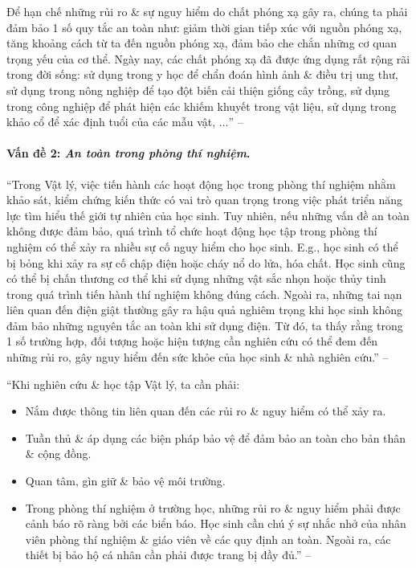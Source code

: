 \documentclass[oneside]{book}
\numberwithin{equation}{section}
\begin{document}
Để hạn chế những rủi ro \& sự nguy hiểm do chất phóng xạ gây ra, chúng ta phải đảm bảo 1 số quy tắc an toàn như: giảm thời gian tiếp xúc với nguồn phóng xạ, tăng khoảng cách từ ta đến nguồn phóng xạ, đảm bảo che chắn những cơ quan trọng yếu của cơ thể. Ngày nay, các chất phóng xạ đã được ứng dụng rất rộng rãi trong đời sống: sử dụng trong y học để chẩn đoán hình ảnh \& điều trị ung thư, sử dụng trong nông nghiệp để tạo đột biến cải thiện giống cây trồng, sử dụng trong công nghiệp để phát hiện các khiếm khuyết trong vật liệu, sử dụng trong khảo cổ để xác định tuổi của các mẫu vật, $\ldots$'' -- \cite[pp. 12--13]{SGK_Vat_Ly_10_Chan_Troi_Sang_Tao}

\paragraph{Vấn đề 2: \textit{An toàn trong phòng thí nghiệm}.} ``Trong Vật lý, việc tiến hành các hoạt động học trong phòng thí nghiệm nhằm khảo sát, kiểm chứng kiến thức có vai trò quan trọng trong việc phát triển năng lực tìm hiểu thế giới tự nhiên của học sinh. Tuy nhiên, nếu những vấn đề an toàn không được đảm bảo, quá trình tổ chức hoạt động học tập trong phòng thí nghiệm có thể xảy ra nhiều sự cố nguy hiểm cho học sinh. E.g., học sinh có thể bị bỏng khi xảy ra sự cố chập điện hoặc cháy nổ do lửa, hóa chất. Học sinh cũng có thể bị chấn thương cơ thể khi sử dụng những vật sắc nhọn hoặc thủy tinh trong quá trình tiến hành thí nghiệm không đúng cách. Ngoài ra, những tai nạn liên quan đến điện giật thường gây ra hậu quả nghiêm trọng khi học sinh không đảm bảo những nguyên tắc an toàn khi sử dụng điện. Từ đó, ta thấy rằng trong 1 số trường hợp, đối tượng hoặc hiện tượng cần nghiên cứu có thể đem đến những rủi ro, gây nguy hiểm đến sức khỏe của học sinh \& nhà nghiên cứu.'' -- \cite[pp. 13--14]{SGK_Vat_Ly_10_Chan_Troi_Sang_Tao}

``Khi nghiên cứu \& học tập Vật lý, ta cần phải:
\begin{itemize}
	\item Nắm được thông tin liên quan đến các rủi ro \& nguy hiểm có thể xảy ra.
	\item Tuần thủ \& áp dụng các biện pháp bảo vệ để đảm bảo an toàn cho bản thân \& cộng đồng.
	\item Quan tâm, gìn giữ \& bảo vệ môi trường.
	\item Trong phòng thí nghiệm ở trường học, những rủi ro \& nguy hiểm phải được cảnh báo rõ ràng bởi các biển báo. Học sinh cần chú ý sự nhắc nhở của nhân viên phòng thí nghiệm \& giáo viên về các quy định an toàn. Ngoài ra, các thiết bị bảo hộ cá nhân cần phải được trang bị đầy đủ.'' -- \cite[p. 14]{SGK_Vat_Ly_10_Chan_Troi_Sang_Tao}
\end{itemize}
\end{document}
